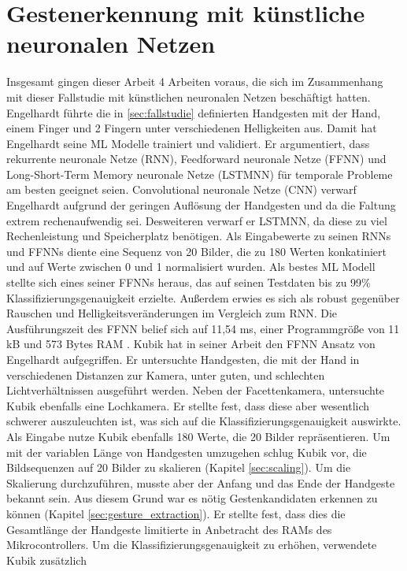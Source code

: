 \section{Gestenerkennung mit künstliche neuronalen Netzen}
Insgesamt gingen dieser Arbeit 4 Arbeiten voraus, die sich im Zusammenhang mit dieser Fallstudie mit künstlichen neuronalen Netzen beschäftigt hatten.
\newline
\newline
Engelhardt führte die in \ref{sec:fallstudie} definierten Handgesten mit der Hand, einem Finger und 2 Fingern unter verschiedenen Helligkeiten aus. Damit hat Engelhardt seine ML Modelle trainiert und validiert. Er
argumentiert, dass rekurrente neuronale Netze (RNN), Feedforward neuronale Netze (FFNN) und Long-Short-Term Memory neuronale Netze (LSTMNN) für temporale Probleme am besten geeignet seien. Convolutional neuronale
Netze (CNN) verwarf Engelhardt aufgrund der geringen Auflösung der Handgesten und da die Faltung extrem rechenaufwendig sei. Desweiteren verwarf er LSTMNN, da diese zu viel Rechenleistung und Speicherplatz
benötigen. Als Eingabewerte zu seinen RNNs und FFNNs diente eine Sequenz von 20 Bilder, die zu 180 Werten konkatiniert und auf Werte zwischen 0 und 1 normalisiert wurden. Als bestes ML Modell stellte sich eines
seiner FFNNs heraus, das auf seinen Testdaten bis zu 99\% Klassifizierungsgenauigkeit erzielte. Außerdem erwies es sich als robust gegenüber Rauschen und Helligkeitsveränderungen im Vergleich zum RNN. Die Ausführungszeit
des FFNN belief sich auf 11,54 ms, einer Programmgröße von 11 kB und 573 Bytes RAM \cite{engelhardtThesis}.
\newline
\newline
Kubik hat in seiner Arbeit den FFNN Ansatz von Engelhardt aufgegriffen. Er untersuchte Handgesten, die mit der Hand in verschiedenen Distanzen zur Kamera, unter guten, und schlechten Lichtverhältnissen ausgeführt werden.
Neben der Facettenkamera, untersuchte Kubik ebenfalls eine Lochkamera. Er stellte fest, dass diese aber wesentlich schwerer auszuleuchten ist, was sich auf die
Klassifizierungsgenauigkeit auswirkte. Als Eingabe nutze Kubik ebenfalls 180 Werte, die 20 Bilder repräsentieren. Um mit der variablen Länge von Handgesten umzugehen schlug Kubik vor, die Bildsequenzen auf 20 Bilder zu
skalieren (Kapitel \ref{sec:scaling}). Um die Skalierung durchzuführen, musste aber der Anfang und das Ende der Handgeste bekannt sein. Aus diesem Grund war es nötig Gestenkandidaten erkennen zu können (Kapitel
\ref{sec:gesture_extraction}). Er stellte fest, dass dies die Gesamtlänge der Handgeste limitierte in Anbetracht des RAMs des Mikrocontrollers. Um die Klassifizierungsgenauigkeit zu erhöhen, verwendete Kubik zusätzlich
